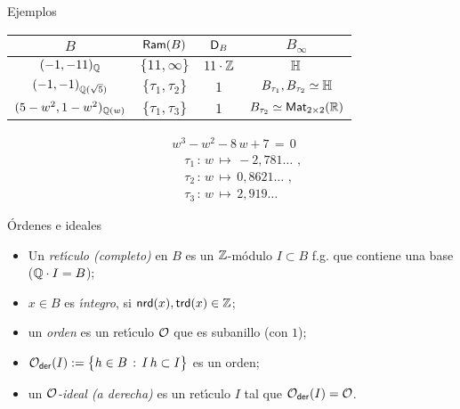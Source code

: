 \begin{frame}{Ejemplos}
	\begin{center}
		\begin{tabular}{c|ccc}
			$B$ & $\Ram(B)$ & $\disc[B]$ & $B_\infty$ \\
			\hline
			$\quatalg[\bb Q]{-1,-11}$ & $\{11,\infty\}$ &
				$11\cdot\bb Z$ & $\bb H$ \\
			$\quatalg[\bb Q(\sqrt 5)]{-1,-1}$ &
				$\{\tau_1,\tau_2\}$ & $1$ &
				$B_{\tau_1},B_{\tau_2}\simeq\bb H$ \\
			$\quatalg[\bb Q(w)]{5- w^2,1-w^2}$ &
				$\{\tau_1,\tau_3\}$ & $1$ &
				$B_{\tau_2}\simeq\MM[2\times 2](\bb R)$
		\end{tabular}
	\end{center}
	\begin{align*}
		& w^3 - w^2 - 8\,w + 7 \,=\,0 \\
		& \quad\tau_1 \,:\,w\,\mapsto\,-2,781\dots \text{ ,} \\
		& \quad\tau_2 \,:\,w\,\mapsto\,0,8621\dots \text{ ,} \\
		& \quad\tau_3 \,:\,w\,\mapsto\,2,919\dots
	\end{align*}
\end{frame}

\begin{frame}{\'{O}rdenes e ideales}
	\begin{defOrdenesEIdeales}\label{def:ordeneseideales}
		\begin{itemize}
			\item Un \emph{ret\'{\i}culo (completo)} en $B$ es un
				$\bb Z$-m\'{o}dulo $I\subset B$ f.g. que
				contiene una base ($\bb Q\cdot I=B$);
			\item $x\in B$ es \emph{\'{\i}ntegro}, si
				$\nrd(x),\trd(x)\in\bb Z$;
			\item un \emph{orden} es un ret\'{\i}culo $\cal O$ que
				es subanillo (con $1$);
			\item
				\begin{math}
					\Oder(I):=\big\{h\in B\,:\,
						I\,h\subset I\big\}
				\end{math} es un orden;
			\item un \emph{$\cal O$-ideal (a derecha)} es un
				ret\'{\i}culo $I$ tal que $\Oder(I)=\cal O$.
		\end{itemize}
	\end{defOrdenesEIdeales}
\end{frame}

